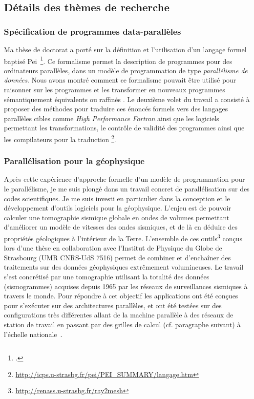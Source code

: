 \subsection{Détails des thèmes de recherche}


\subsubsection{Spécification de programmes data-parallèles}

Ma  thèse  de   doctorat  \cite{icps-1997-4}  a  porté  sur   la  définition  et
l'utilisation  d'un   langage  formel  baptis\'e   Pei~\footcite{Violard92}.  Ce
formalisme permet la description de  programmes pour des ordinateurs parallèles,
dans un  modèle de  programmation de type  \emph{parallélisme de  données}. Nous
avons montré comment  ce formalisme pouvait être utilisé pour  raisonner sur les
programmes et les transformer  en nouveaux programmes sémantiquement équivalents
ou    raffinés   \cite{icps-1994-46,icps-1995-1,icps-1997-3,icps-1996-2}.     Le
deuxième volet du  travail a consisté à proposer des  méthodes pour traduire ces
énoncés  formels   vers  des  langages  parallèles   cibles  comme  \textit{High
  Performance Fortran}  ainsi que les logiciels  permettant les transformations,
le  contrôle de  validité  des programmes  ainsi que  les  compilateurs pour  la
traduction%
\footnote{\url{http://icps.u-strasbg.fr/pei/PEI_SUMMARY/langage.htm}}.


\subsubsection{Parallélisation pour la géophysique}

Après cette expérience d'approche formelle  d'un modèle de programmation pour le
parallélisme, je me  suis plongé dans un travail concret  de parallélisation sur
des codes scientifiques. Je me suis investi en particulier dans la conception et
le développement d'outils logiciels pour  la géophysique. L'enjeu est de pouvoir
calculer  une  tomographie  sismique  globale en  ondes  de  volumes  permettant
d'améliorer un modèle de  vitesses des ondes sismiques, et de  là en déduire des
propriétés  géologiques   à  l'intérieur   de  la   Terre.  L'ensemble   de  ces
outils\footnote{\url{http://renass.u-strasbg.fr/ray2mesh}}  conçus   lors  d'une
thèse en collaboration  avec l'Institut de Physique du Globe  de Strasbourg (UMR
CNRS-UdS 7516) permet de combiner et d'enchaîner des traitements sur des données
géophysiques  extrêmement  volumineuses. Le  travail  s'est  concrétisé par  une
tomographie  utilisant la  totalité des  données (sismogrammes)  acquises depuis
1965  par les  réseaux  de  surveillances sismiques  à  travers  le monde.  Pour
répondre à cet objectif les applications ont été conçues pour s'exécuter sur des
architectures  parallèles,  et  ont  été testées  sur  des  configurations  très
différentes allant de  la machine parallèle à des réseaux  de station de travail
en  passant par  des  grilles de  calcul (cf.  paragraphe  suivant) à  l'échelle
nationale~\cite{icps-2005-146,icps-2007-184}.


